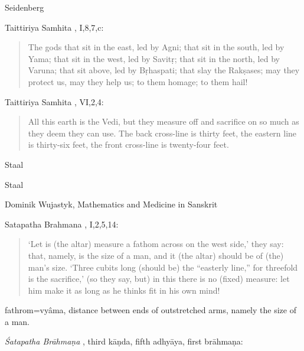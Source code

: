 \documentclass{article}
\begin{document}
Seidenberg \cite{seidenberg1983}

Taittiriya Samhita \cite[p.~119]{black1}, I,8,7,c:

\begin{quote}
The gods that sit in the east, led by Agni; that sit in the south,
led by Yama; that sit in the west, led by Savit\d{r}; that sit in the north,
led by Varuna; that sit above, led by B\d{r}haspati; that slay the Rak\d{s}ases;
may they protect us, may they help us; to them homage; to them
hail!
\end{quote}

Taittiriya Samhita \cite[p.~506]{black2}, VI,2,4:

\begin{quote}
All this earth is the 
Vedi, but they measure off and sacrifice on so much as they deem they can
use. The back cross-line is thirty feet, the eastern line is thirty-six feet,
the front cross-line is twenty-four feet.
\end{quote}

Staal \cite[p.~]{agniI}

\begin{quote}

\end{quote}

Staal \cite[p.~]{agniI}

\begin{quote}

\end{quote}



Dominik Wujastyk, Mathematics and Medicine in Sanskrit

Satapatha Brahmana \cite[pp.~62--63]{eggelingI}, I,2,5,14:

\begin{quote}
`Let is (the altar) measure a fathom across 
on the west side,' they say: that, namely, is the
size of a man, and it (the altar) should be of (the)
man's size. `Three cubits long (should be) the
``easterly line,'' for threefold is the sacrifice,' (so they say, but)
in this there is no (fixed) measure: let
him make it as long as he thinks fit in his own mind!
\end{quote}

fathrom=vy\^ama, distance between ends of outstretched arms, namely the size of a man.

{\em \'Satapatha Br\=ahma\d{n}a} \cite[pp.~111--112]{eggelingII}, third k\=a\d{n}da, fifth adhy\=aya, first br\=ahma\d{n}a:
\end{document}
